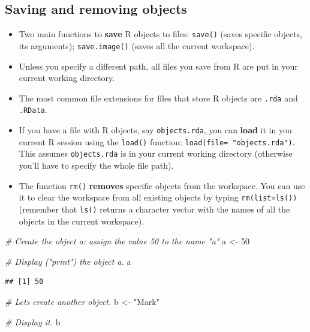 \documentclass[
]{book}
\newenvironment{Shaded}{\begin{snugshade}}{\end{snugshade}}
\newcommand{\CommentTok}[1]{\textcolor[rgb]{0.56,0.35,0.01}{\textit{#1}}}
\newcommand{\DecValTok}[1]{\textcolor[rgb]{0.00,0.00,0.81}{#1}}
\newcommand{\NormalTok}[1]{#1}
\newcommand{\OtherTok}[1]{\textcolor[rgb]{0.56,0.35,0.01}{#1}}
\newcommand{\StringTok}[1]{\textcolor[rgb]{0.31,0.60,0.02}{#1}}
\providecommand{\tightlist}{%
  \setlength{\itemsep}{0pt}\setlength{\parskip}{0pt}}
\begin{document}
\hypertarget{saving-and-removing-objects}{%
\subsection{Saving and removing objects}\label{saving-and-removing-objects}}

\begin{itemize}
\tightlist
\item
  Two main functions to \textbf{save} R objects to files: \texttt{save()} (saves specific objects, its arguments); \texttt{save.image()} (saves all the current workspace).
\item
  Unless you specify a different path, all files you save from R are put in your current working directory.
\item
  The most common file extensions for files that store R objects are \texttt{.rda} and \texttt{.RData}.
\item
  If you have a file with R objects, say \texttt{objects.rda}, you can \textbf{load} it in you current R session using the \texttt{load()} function: \texttt{load(file=\ "objects.rda")}. This assumes \texttt{objects.rda} is in your current working directory (otherwise you'll have to specify the whole file path).
\item
  The function \texttt{rm()} \textbf{removes} specific objects from the workspace. You can use it to clear the workspace from all existing objects by typing \texttt{rm(list=ls())} (remember that \texttt{ls()} returns a character vector with the names of all the objects in the current workspace).
\end{itemize}

\begin{Shaded}
\begin{Highlighting}[]
\CommentTok{\# Create the object a: assign the value 50 to the name "a"}
\NormalTok{a }\OtherTok{\textless{}{-}} \DecValTok{50}

\CommentTok{\# Display ("print") the object a.}
\NormalTok{a}
\end{Highlighting}
\end{Shaded}

\begin{verbatim}
## [1] 50
\end{verbatim}

\begin{Shaded}
\begin{Highlighting}[]
\CommentTok{\# Let\textquotesingle{}s create another object.}
\NormalTok{b }\OtherTok{\textless{}{-}} \StringTok{"Mark"}

\CommentTok{\# Display it.}
\NormalTok{b}
\end{Highlighting}
\end{Shaded}
\end{document}
